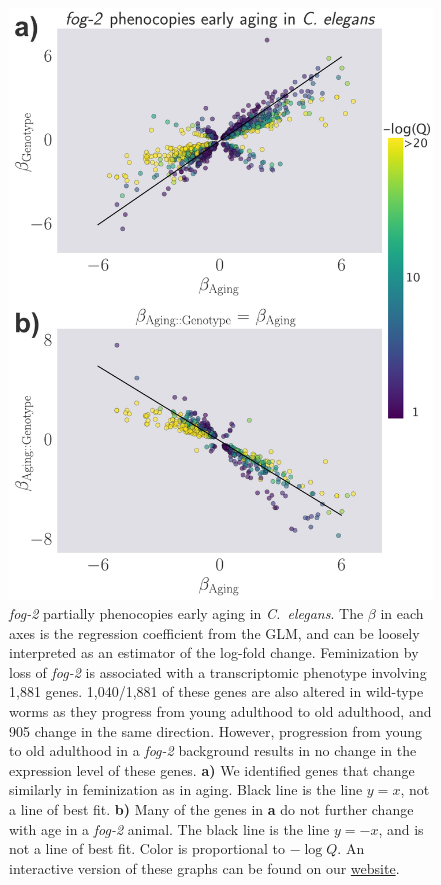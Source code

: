 \documentclass[10pt,letterpaper,twocolumn]{article}
\newcommand{\cel}{\emph{C.~elegans}}
\newcommand{\fog}{\emph{fog-2}}
\newcommand{\fogn}{1,881}
\newcommand{\coexpressed}{905}
\newcommand{\intersectn}{1,040}
\newcommand{\webref}{
\href{https://wormlabcaltech.github.io/Angeles_Leighton_2016/}{website}}
\begin{document}
\begin{figure}
\renewcommand{\familydefault}{\sfdefault}\normalfont{}
\centering
\includegraphics[width=\linewidth]{../output/figs/final_figs/aberrant_aging.pdf}
\caption{ \fog{} partially phenocopies early aging in \cel{}. The $\beta$ in each axes is the regression coefficient from the GLM, and can be loosely interpreted as an estimator of the log-fold change.
Feminization by loss of \fog{} is associated with a transcriptomic phenotype involving \fogn{} genes. \intersectn{}/\fogn{} of these genes are also altered in wild-type worms as they progress from young adulthood to old adulthood, and \coexpressed{} change in the same direction. However, progression from young to old adulthood in a \fog{} background results in no change in the expression level of these genes. \textbf{a)} We identified genes that change similarly in feminization as in aging. Black line is the line $y=x$, not a line of best fit. \textbf{b)} Many of the genes in \textbf{a} do not further change with age in a \fog{} animal.
The black line is the line $y=-x$, and is not a line of best fit. Color is proportional to $-\log{Q}$.
An interactive version of these graphs can be found on our \webref{}.
}%
\label{fig:aberrant_aging}
\end{figure}
\end{document}
